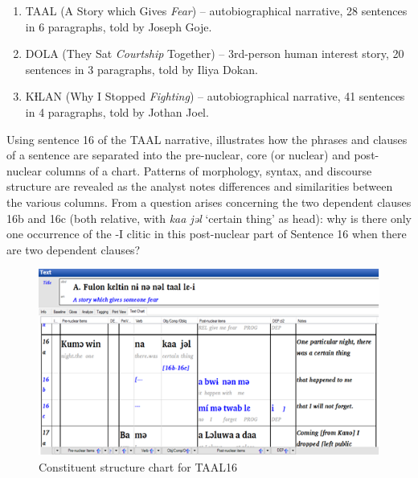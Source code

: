 \documentclass[output=paper]{langscibook}
\begin{document}
\begin{enumerate}\sloppy
    \item TAAL (A Story which Gives \textit{Fear}) – autobiographical narrative, 28 sentences in 6 paragraphs, told by Joseph Goje.
    \item DOLA (They Sat \textit{Courtship} Together) – 3rd-person human interest story, 20 sentences in 3 paragraphs, told by Iliya Dokan.
    \item KƗLAN (Why I Stopped \textit{Fighting}) – autobiographical narrative, 41 sentences in 4 paragraphs, told by Jothan Joel.
\end{enumerate}

\noindent Using sentence 16 of the TAAL narrative,  illustrates how the phrases and clauses of a sentence are separated into the pre-nuclear, core (or nuclear) and post-nuclear columns of a chart. Patterns of morphology, syntax, and discourse structure are revealed as the analyst notes differences and similarities between the various columns. From  a question arises concerning the two dependent clauses 16b and 16c (both relative, with \textit{kaa jəl} `certain thing' as head): why is there only one occurrence of the -I clitic in this post-nuclear part of Sentence 16 when there are two dependent clauses?

\begin{figure}
    \includegraphics[width=\textwidth]{figures/Structure.png}
    \caption{Constituent structure chart for TAAL16}
    \label{fig:dettweiler:StructureChart}
\end{figure}
\end{document}
